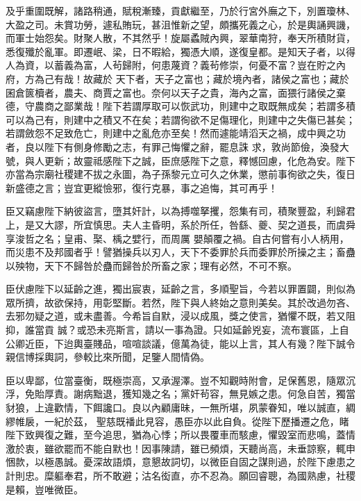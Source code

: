 \begin{pinyinscope}
 及乎重圍既解，諸路稍通，賦稅漸臻，貢獻繼至，乃於行宮外廡之下，別置瓊林、大盈之司。未賞功勞，遽私賄玩，甚沮惟新之望，頗攜死義之心，於是輿誦興譏，而軍士始怨矣。財聚人散，不其然乎！旋屬蟊賊內興，翠華南狩，奉天所積財貨，悉復殲於亂軍。即遷岷、梁，日不暇給，獨憑大順，遂復皇都。是知天子者，以得人為資，以蓄義為富，人茍歸附，何患蔑資？義茍修崇，何憂不富？豈在貯之內府，方為己有哉！故藏於
 天下者，天子之富也；藏於境內者，諸侯之富也；藏於囷倉篋櫝者，農夫、商賈之富也。奈何以天子之貴，海內之富，面猥行諸侯之棄德，守農商之鄙業哉！陛下若謂厚取可以恢武功，則建中之取既無成矣；若謂多積可以為己有，則建中之積又不在矣；若謂徇欲不足傷理化，則建中之失傷已甚矣；若謂斂怨不足致危亡，則建中之亂危亦至矣！然而遽能靖滔天之禍，成中興之功者，良以陛下有側身修勵之志，有罪己悔懼之辭，罷息誅
 求，敦尚節儉，渙發大號，與人更新；故靈祗感陛下之誠，臣庶感陛下之意，釋憾回慮，化危為安。陛下亦當為宗廟社稷建不拔之永圖，為子孫黎元立可久之休業，懲前事徇欲之失，復日新盛德之言；豈宜更縱憸邪，復行克暴，事之追悔，其可再乎！



 臣又竊慮陛下納彼盜言，墮其奸計，以為搏噬拏攫，怨集有司，積聚豐盈，利歸君上，是又大謬，所宜慎思。夫人主昏明，系於所任，咎繇、夔、契之道長，而虞舜享浚哲之名；皇甫、棸、楀之嬖行，而周厲
 嬰顛覆之禍。自古何嘗有小人柄用，而災患不及邦國者乎！譬猶操兵以刃人，天下不委罪於兵而委罪於所操之主；畜蠱以殃物，天下不歸咎於蠱而歸咎於所畜之家；理有必然，不可不察。



 臣伏慮陛下以延齡之進，獨出宸衷，延齡之言，多順聖旨，今若以罪置闢，則似為眾所擠，故欲保持，用彰堅斷。若然，陛下與人終始之意則美矣。其於改過勿吝、去邪勿疑之道，或未盡善。今希旨自默，浸以成風，獎之使言，猶懼不既，若又阻抑，誰當貢
 誠？或恐未亮斯言，請以一事為證。只如延齡兇妄，流布寰區，上自公卿近臣，下迨輿臺賤品，喧喧談議，億萬為徒，能以上言，其人有幾？陛下誠令親信博採輿詞，參較比來所聞，足鑒人間情偽。



 臣以卑鄙，位當臺衡，既極崇高，又承渥澤。豈不知觀時附會，足保舊恩，隨眾沉浮，免貽厚責。謝病黜退，獲知幾之名；黨奸茍容，無見嫉之患。何急自苦，獨當豺狼，上違歡情，下餌讒口。良以內顧庸昧，一無所堪，夙蒙眷知，唯以誠直，綢繆帷扆，一紀於茲，
 聖慈既襎此見容，愚臣亦以此自負。從陛下歷播遷之危，睹陛下致興復之難，至今追思，猶為心悸；所以畏覆車而駭慮，懼毀室而悲鳴，蓋情激於衷，雖欲罷而不能自默也！因事陳請，雖已頻煩，天聽尚高，未垂諒察，輒申悃款，以極愚誠。憂深故語煩，意懇故詞切，以微臣自固之謀則過，於陛下慮患之計則忠。糜軀奉君，所不敢避；沽名衒直，亦不忍為。願回睿聰，為國熟慮，社稷是賴，豈唯微臣。




\end{pinyinscope}
